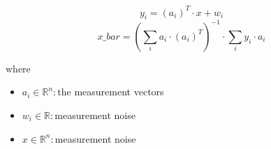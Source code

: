 \documentclass[12pt]{article}
\begin{document}
\[
\textit{y}_{ \textit{i} } = (\textit{a}_{ \textit{i} })^T \cdot \textit{x} + \textit{w}_{ \textit{i} }
\]
\[
\textit{x\_bar} = (\sum_\textit{i} \textit{a}_{ \textit{i} } \cdot (\textit{a}_{ \textit{i} })^T)^{-1} \cdot \sum_\textit{i} \textit{y}_{ \textit{i} } \cdot \textit{a}_{ \textit{i} }
\]

where
\begin{itemize}
\item $\textit{a}_{\textit{i}} \in \mathbb{R}^{ \textit{n}}:$the measurement vectors  
\item $\textit{w}_{\textit{i}} \in \mathbb{{R}}:$measurement noise 
\item $\textit{x} \in \mathbb{R}^{ \textit{n}}:$measurement noise 
\end{itemize}
\end{document}
